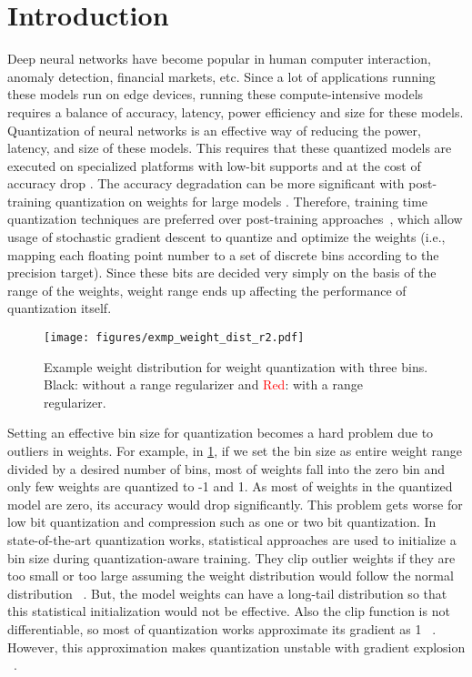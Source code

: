 \documentclass[10pt,twocolumn,letterpaper]{article}
\begin{document}
\section{Introduction}
Deep neural networks have become popular in human computer interaction, anomaly detection, financial markets, etc. Since a lot of applications running these models run on edge devices, running these compute-intensive models requires a balance of accuracy, latency, power efficiency and size for these models. Quantization of neural networks is an effective way of reducing the power, latency, and size of these models. This requires that these quantized models are executed on
specialized platforms with low-bit supports and at the cost of accuracy drop \cite{hawq,haq}. The accuracy degradation can be more significant with post-training quantization on weights for large models \cite{bengio2013estimating}. Therefore, training time quantization techniques are preferred over post-training approaches~\cite{bengio2013estimating,zhou2016dorefa}, which allow usage of stochastic gradient descent to quantize and optimize the weights (i.e., mapping each floating point number to a set of discrete bins according to the precision target). Since these bits are decided very simply on the basis of the range of the weights, weight range ends up affecting the performance of quantization itself. 









\begin{figure}[t]
\vskip 0.0in
\begin{center}
\centerline{\texttt{[image: figures/exmp\_weight\_dist\_r2.pdf]}}
\vskip -0.0in
\caption{Example weight distribution for weight quantization with three bins. Black: without a range regularizer and \textcolor{red}{Red}: with a range regularizer.}
\label{fig_weight_dist}
\end{center}
\vskip -0.0in
\end{figure}

Setting an effective bin size for quantization becomes a hard problem due to outliers in weights. For example, in \cref{fig_weight_dist}, if we set the bin size as entire weight range divided by a desired number of bins, most of weights fall into the zero bin and only few weights are quantized to -1 and 1. As most of weights in the quantized model are zero, its accuracy would drop significantly. This problem gets worse for low bit quantization and compression such as one or two bit quantization. In state-of-the-art quantization works, statistical approaches are used to initialize a bin size during quantization-aware training. They clip outlier weights if they are too small or too large assuming the weight distribution would follow the normal distribution ~\cite{esser2019learned, lee2021network}. But, the model weights can have a long-tail distribution so that this statistical initialization would not be effective. Also the clip function is not differentiable, so most of quantization works approximate its gradient as 1 ~\cite{bengio2013estimating}. However, this approximation makes quantization unstable with gradient explosion ~\cite{sakr2022optimal}. 
\end{document}
